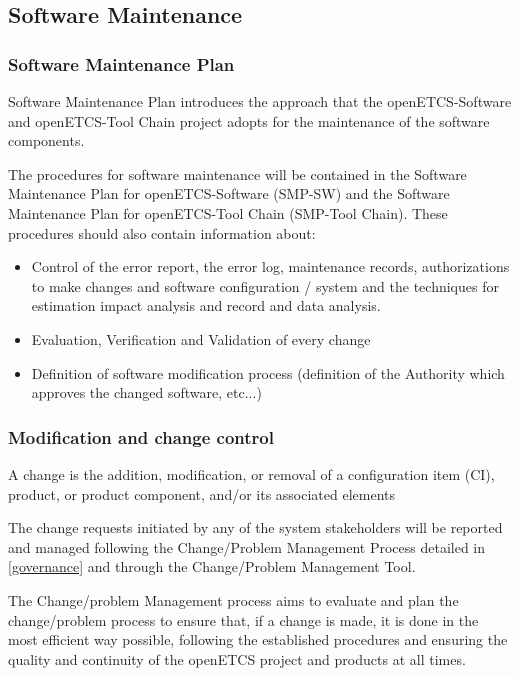 \documentclass{template/openetcs_article}
\begin{document}
\subsection{Software Maintenance}
\subsubsection{Software Maintenance Plan}
Software Maintenance Plan introduces the approach that the openETCS-Software and openETCS-Tool Chain project adopts for the maintenance of the software components.

The procedures for software maintenance will be contained in the Software Maintenance Plan for openETCS-Software (SMP-SW) and the Software Maintenance Plan for openETCS-Tool Chain (SMP-Tool Chain). These procedures should also contain information about:
\begin{itemize}
\item Control of the error report, the error log, maintenance records, authorizations to make changes and software configuration / system and the techniques for estimation impact analysis and record and data analysis.
\item Evaluation, Verification and Validation of every change
\item Definition of software modification process (definition of the Authority which approves the changed software, etc...)
\end{itemize}


\subsubsection{Modification and change control }

A change is the addition, modification, or removal of a configuration item (CI), product, or product component, and/or its associated elements

The change requests initiated by any of the system stakeholders will be reported and managed following the Change/Problem Management Process  \citep{emp} detailed in \href{https://github.com/openETCS/governance/tree/master/Change-Problem%20Process}{[governance]} and through the Change/Problem Management Tool.

The Change/problem Management process aims to evaluate and plan the change/problem process to ensure that, if a change is made, it is done in the most efficient way possible, following the established procedures and ensuring the quality and continuity of the openETCS project and products at all times.
\end{document}
